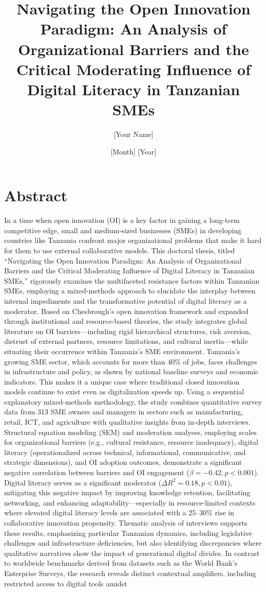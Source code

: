 \documentclass[12pt,a4paper]{report}
\title{Navigating the Open Innovation Paradigm: An Analysis of Organizational Barriers and the Critical Moderating Influence of Digital Literacy in Tanzanian SMEs}
\author{[Your Name]}
\date{[Month] [Year]}
\begin{document}
\maketitle
{}
\chapter*{Abstract}
In a time when open innovation (OI) is a key factor in gaining a long-term competitive edge, small and medium-sized businesses (SMEs) in developing countries like Tanzania confront major organizational problems that make it hard for them to use external collaborative models. This doctoral thesis, titled ``Navigating the Open Innovation Paradigm: An Analysis of Organizational Barriers and the Critical Moderating Influence of Digital Literacy in Tanzanian SMEs,'' rigorously examines the multifaceted resistance factors within Tanzanian SMEs, employing a mixed-methods approach to elucidate the interplay between internal impediments and the transformative potential of digital literacy as a moderator. Based on Chesbrough's open innovation framework and expanded through institutional and resource-based theories, the study integrates global literature on OI barriers---including rigid hierarchical structures, risk aversion, distrust of external partners, resource limitations, and cultural inertia---while situating their occurrence within Tanzania's SME environment. Tanzania's growing SME sector, which accounts for more than 40\% of jobs, faces challenges in infrastructure and policy, as shown by national baseline surveys and economic indicators. This makes it a unique case where traditional closed innovation models continue to exist even as digitalization speeds up. Using a sequential explanatory mixed-methods methodology, the study combines quantitative survey data from 313 SME owners and managers in sectors such as manufacturing, retail, ICT, and agriculture with qualitative insights from in-depth interviews. Structural equation modeling (SEM) and moderation analyses, employing scales for organizational barriers (e.g., cultural resistance, resource inadequacy), digital literacy (operationalized across technical, informational, communicative, and strategic dimensions), and OI adoption outcomes, demonstrate a significant negative correlation between barriers and OI engagement (\(\beta = -0.42, p < 0.001\)). Digital literacy serves as a significant moderator (\(\Delta R^2 = 0.18, p < 0.01\)), mitigating this negative impact by improving knowledge retention, facilitating networking, and enhancing adaptability---especially in resource-limited contexts where elevated digital literacy levels are associated with a 25--30\% rise in collaborative innovation propensity. Thematic analysis of interviews supports these results, emphasizing particular Tanzanian dynamics, including legislative challenges and infrastructure deficiencies, but also identifying discrepancies where qualitative narratives show the impact of generational digital divides. In contrast to worldwide benchmarks derived from datasets such as the World Bank's Enterprise Surveys, the research reveals distinct contextual amplifiers, including restricted access to digital tools amidst 
\end{document}
